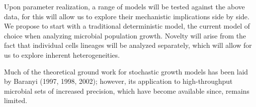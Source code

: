 \documentclass{bioinfo}
\begin{document}
Upon parameter realization, a range of models will be tested against the above data, for this will allow us to explore their mechanistic implications side by side. We propose to start with a traditional deterministic model, the current model of choice when analyzing microbial population growth. Novelty will arise from the fact that individual cells lineages will be analyzed separately, which will allow for us to explore inherent heterogeneities. 


Much of the theoretical ground work for stochastic growth models has been laid by Baranyi (1997, 1998, 2002); however, its application to high-throughput microbial sets of increased precision, which have become available since, remains limited. 
\end{document}
